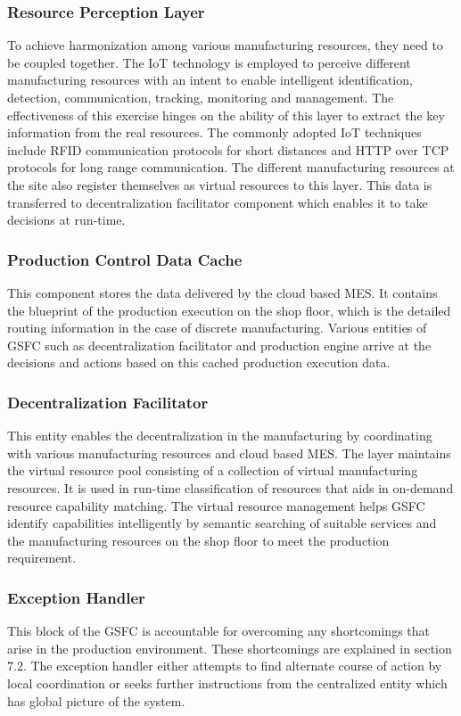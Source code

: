 \documentclass[10pt,conference,compsocconf]{IEEEtran}
\begin{document}
\subsubsection{Resource Perception Layer}
To achieve harmonization among various manufacturing resources, they need to be coupled together. The IoT technology is employed to perceive different manufacturing resources with an intent to enable intelligent identification, detection, communication, tracking, monitoring and management. The effectiveness of this exercise hinges on the ability of this layer to extract the key information from the real resources. The commonly adopted IoT techniques include RFID communication protocols for short distances and HTTP over TCP protocols for long range communication. The different manufacturing resources at the site also register themselves as virtual resources to this layer. This data is transferred to decentralization facilitator component which enables it to take decisions at run-time.

\subsubsection{Production Control Data Cache}
This component stores the data delivered by the cloud based MES. It contains the blueprint of the production execution on the shop floor, which is the detailed routing information in the case of discrete manufacturing. Various entities of GSFC such as decentralization facilitator and production engine arrive at the decisions and actions based on this cached production execution data.

\subsubsection{Decentralization Facilitator}
This entity enables the decentralization in the manufacturing by coordinating with various manufacturing resources and cloud based MES. The layer maintains the virtual resource pool consisting of a collection of virtual manufacturing resources. It is used in run-time classification of resources that aids in on-demand resource capability matching. The virtual resource management helps GSFC identify capabilities intelligently by semantic searching of suitable services and the manufacturing resources on the shop floor to meet the production requirement.

\subsubsection{Exception Handler}
This block of the GSFC is accountable for overcoming any shortcomings that arise in the production environment. These shortcomings are explained in section 7.2. The exception handler either attempts to find alternate course of action by local coordination or seeks further instructions from the centralized entity which has global picture of the system.
\end{document}
